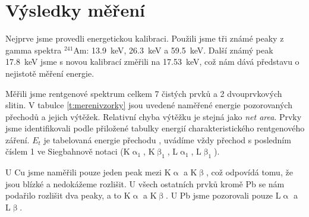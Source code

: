 \section*{Výsledky měření}
Nejprve jsme provedli energetickou kalibraci. Použili jsme tři známé peaky z gamma spektra $^{241}$Am: \SI{13.9}{\keV}, \SI{26.3}{\keV} a \SI{59.5}{\keV}. Další známý peak \SI{17.8}{\keV} jsme s novou kalibrací změřili na \SI{17.53}{\keV}, což nám dává představu o nejistotě měření energie.

Měřili jsme rentgenové spektrum celkem 7 čistých prvků a 2 dvouprvkových slitin. V tabulce \ref{t:merenivzorky} jsou uvedené naměřené energie pozorovaných přechodů a jejich výtěžek. Relativní chyba výtěžku je stejná jako \emph{net area}. Prvky jsme identifikovali podle přiložené tabulky energií charakteristického rentgenového záření. $E_t$ je tabelovaná energie přechodu \cite{energie}, uvádíme vždy přechod s posledním číslem 1 ve Siegbahnově notaci (K$\upalpha_1$, K$\upbeta_1$, L$\upalpha_1$, L$\upbeta_1$).

U Cu jsme naměřili pouze jeden peak mezi K$\upalpha$ a K$\upbeta$, což odpovídá tomu, že jsou blízké a nedokážeme rozlišit. U všech ostatních prvků kromě Pb se nám podařilo rozlišit dva peaky, a to K$\upalpha$ a K$\upbeta$. U Pb jsme pozorovali pouze L$\upalpha$ a L$\upbeta$.


